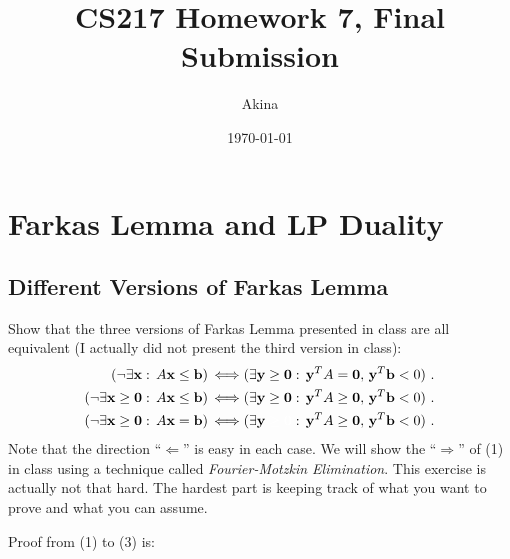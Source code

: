 \documentclass[11pt,a4paper,oneside]{article}
\newcommand{\y}{\mathbf{y}}
\newcommand{\x}{\mathbf{x}}
\renewcommand{\b}{\mathbf{b}}
\newcommand{\zero}{\mathbf{0}}
\renewcommand{\hwtitle} {CS217 Homework 7, Final Submission}
\renewcommand{\hwauthor}{Akina}
\renewcommand{\hwdate}{\today}
\begin{document}
\title{\hwtitle}
\author{\hwauthor}
\date{\hwdate}
\maketitle


\section{Farkas Lemma and LP Duality}

\subsection{Different Versions of Farkas Lemma}

\begin{problem}{1}
	\statement
 Show that the three versions of Farkas Lemma presented in class are all equivalent (I actually did not present
 the third version in class):
 \begin{align}
   ( \neg \exists \x : \, A \x \leq \b ) \, & \Longleftrightarrow 
    ( \exists \y \geq \zero : \, \y^T A = \zero, \,     \y^T \b < 0 ) \ . \\
      ( \neg \exists \x \geq \zero : \, A \x \leq \b ) \, & \Longleftrightarrow 
    ( \exists \y \geq \zero : \, \y^T A \geq \zero, \,  \y^T \b < 0 ) \ . \\
   ( \neg \exists \x \geq \zero : \, A \x = \b ) \, & \Longleftrightarrow 
    ( \exists \y \begingroup \color{white} \geq \zero \endgroup : \, \y^T A \geq \zero, \,  \y^T \b < 0 ) \ .
 \end{align}
  Note that the direction ``$\Longleftarrow$'' is easy in each case. 
  We will show the ``$\Longrightarrow$'' of (1) in class using a technique called {\em Fourier-Motzkin Elimination}. 
  This exercise is actually not that hard. The hardest part is keeping track of what you 
  want to prove and what you can assume.
    
    \solution
	Proof from (1) to (3) is:
	

\end{problem}
\end{document}
